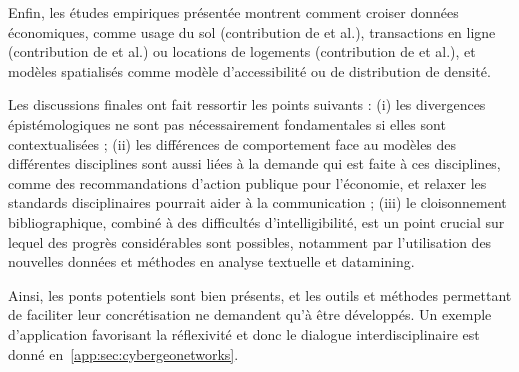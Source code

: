Enfin, les études empiriques présentée montrent comment croiser données économiques, comme usage du sol (contribution de  et al.), transactions en ligne (contribution de  et al.) ou locations de logements (contribution de  et al.), et modèles spatialisés comme modèle d'accessibilité ou de distribution de densité.

Les discussions finales ont fait ressortir les points suivants : (i) les divergences épistémologiques ne sont pas nécessairement fondamentales si elles sont contextualisées ; (ii) les différences de comportement face au modèles des différentes disciplines sont aussi liées à la demande qui est faite à ces disciplines, comme des recommandations d'action publique pour l'économie, et relaxer les standards disciplinaires pourrait aider à la communication ; (iii) le cloisonnement bibliographique, combiné à des difficultés d'intelligibilité, est un point crucial sur lequel des progrès considérables sont possibles, notamment par l'utilisation des nouvelles données et méthodes en analyse textuelle et datamining.

Ainsi, les ponts potentiels sont bien présents, et les outils et méthodes permettant de faciliter leur concrétisation ne demandent qu'à être développés. Un exemple d'application favorisant la réflexivité et donc le dialogue interdisciplinaire est donné en~\ref{app:sec:cybergeonetworks}.











\stars



